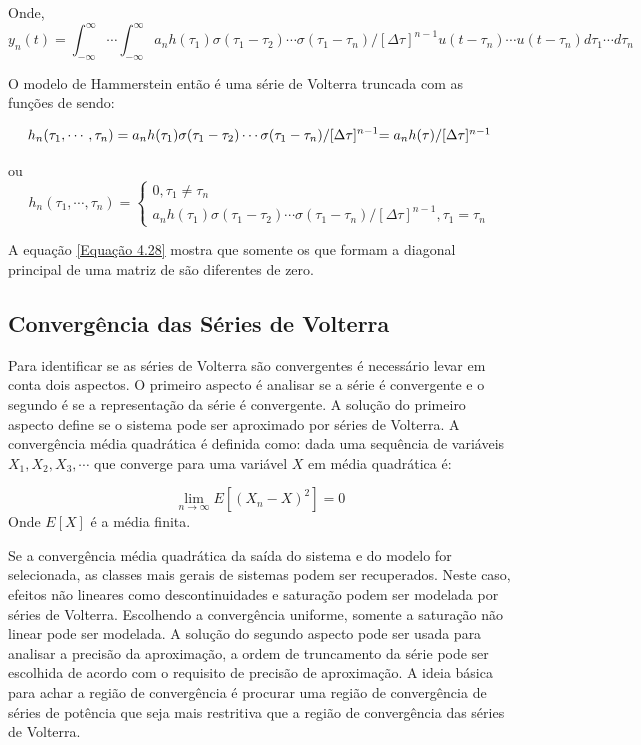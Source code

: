 Onde,
\begin{equation}
y_{n}(t) =  \int_{-\infty}^{\infty} \cdots \int_{-\infty}^{\infty}a_{n}h(\tau_{1})\sigma(\tau_{1} - \tau_{2}) \cdots \sigma(\tau_{1} - \tau_{n})/[\Delta\tau]^{n-1} u(t-\tau_{n})\cdots u(t-\tau_{n})d\tau_{1}\cdots d\tau_{n}
\label{Equação 4.26}
\end{equation}

O modelo de Hammerstein então é uma série de Volterra truncada com as funções de  sendo:

\begin{equation}
h_{n}(\tau_{1},\cdots,\tau_{n})=a_{n}h(\tau_{1})\sigma(\tau_{1} - \tau_{2}) \cdots \sigma(\tau_{1} - \tau_{n})/[\Delta\tau]^{n-1} $$
$$ = a_{n}h(\tau)/[\Delta\tau]^{n-1}
\end{equation}

ou 
\begin{equation}
h_{n}(\tau_{1},\cdots,\tau_{n}) = \left\{\begin{array}{ll} 0  , \tau_{1} \neq \tau_{n}\\ a_{n}h(\tau_{1})\sigma(\tau_{1} - \tau_{2}) \cdots \sigma(\tau_{1} - \tau_{n})/[\Delta \tau]^{n-1} , \tau_{1} = \tau_{n} \end{array}\right.
\label{Equação 4.28}
\end{equation}

A equação \ref{Equação 4.28} mostra que somente os  que formam a diagonal principal de uma matriz de  são diferentes de zero.\cite{cheng2017volterra}

\subsection*{Convergência das Séries de Volterra}
Para identificar se as séries de Volterra são convergentes é necessário levar em conta dois aspectos. O primeiro aspecto é analisar se a série é convergente e o segundo é se a representação da série é convergente. A solução do primeiro aspecto define se o sistema pode ser aproximado por séries de Volterra. A convergência média quadrática é definida como: dada uma sequência de variáveis $X_{1}, X_{2},X_{3},\cdots$ que converge para uma variável $X$ em média quadrática é:

\begin{equation}
\lim\limits_{n \rightarrow \infty} E[(X_{n} - X)^{2}] = 0
\end{equation} 
Onde $E[X]$ é a média finita.

Se a convergência média quadrática da saída do sistema e do modelo for selecionada, as classes mais gerais de sistemas podem ser recuperados. Neste caso, efeitos não lineares como descontinuidades e saturação podem ser modelada por séries de Volterra. Escolhendo a convergência uniforme, somente a saturação não linear pode ser modelada. A solução do segundo aspecto pode ser usada para analisar a precisão da aproximação, a ordem de truncamento da série pode ser escolhida de acordo com o requisito de precisão de aproximação. A ideia básica para achar a região de convergência é procurar uma região de convergência de séries de potência que seja mais restritiva que a região de convergência das séries de Volterra.

